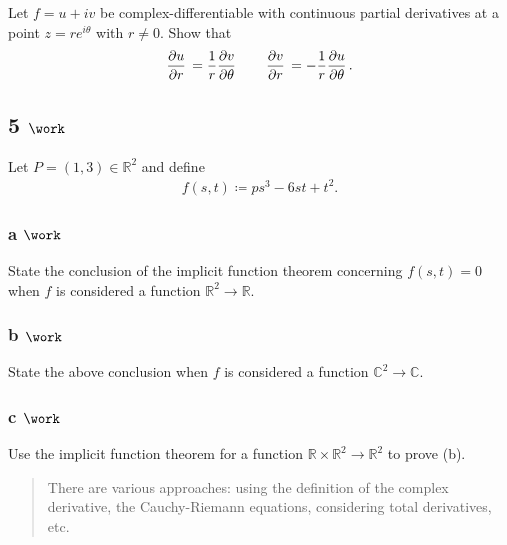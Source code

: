 Let \(f = u+iv\) be complex-differentiable with continuous partial
derivatives at a point \(z = re^{i\theta}\) with \(r\neq 0\). Show that
\begin{align*}  
{\frac{\partial u}{\partial r}\,} = {1\over r}{\frac{\partial v}{\partial \theta}\,} \qquad {\frac{\partial v}{\partial r}\,} = -{1\over r}{\frac{\partial u}{\partial \theta}\,}
.\end{align*}

\hypertarget{work-13}{%
\subsection{\texorpdfstring{5
\(\work\)}{5 \textbackslash work}}\label{work-13}}

Let \(P = (1, 3) \in {\mathbb{R}}^2\) and define
\begin{align*}  
f(s, t) \coloneqq ps^3 -6st + t^2
.\end{align*}

\hypertarget{a-work-2}{%
\subsubsection{\texorpdfstring{a
\(\work\)}{a \textbackslash work}}\label{a-work-2}}

State the conclusion of the implicit function theorem concerning
\(f(s, t) = 0\) when \(f\) is considered a function
\({\mathbb{R}}^2\to{\mathbb{R}}\).

\hypertarget{b-work-2}{%
\subsubsection{\texorpdfstring{b
\(\work\)}{b \textbackslash work}}\label{b-work-2}}

State the above conclusion when \(f\) is considered a function
\({\mathbb{C}}^2\to {\mathbb{C}}\).

\hypertarget{c-work-2}{%
\subsubsection{\texorpdfstring{c
\(\work\)}{c \textbackslash work}}\label{c-work-2}}

Use the implicit function theorem for a function
\({\mathbb{R}}\times{\mathbb{R}}^2 \to {\mathbb{R}}^2\) to prove (b).

\begin{quote}
There are various approaches: using the definition of the complex
derivative, the Cauchy-Riemann equations, considering total derivatives,
etc.
\end{quote}

